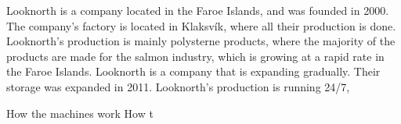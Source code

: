 Looknorth is a company located in the Faroe Islands, and was founded in 2000. The company's factory is located in Klaksvík, where all their production is done. Looknorth's production is mainly polysterne products, where the majority of the products are made for the salmon industry, which is growing at a rapid rate in the Faroe Islands.
Looknorth is a company that is expanding gradually. Their storage was expanded in 2011.
Looknorth's production is running 24/7,

How the machines work
How t 
